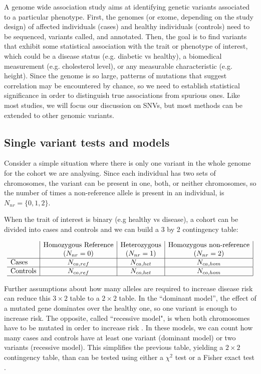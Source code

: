 A genome wide association study aims at identifying genetic variants associated to a particular phenotype. 
First, the genomes (or exome, depending on the study design) of affected individuals (cases) and healthy individuals (controls) need to be sequenced, variants called, and annotated. 
Then, the goal is to find variants that exhibit some statistical association with the trait or phenotype of interest, which could be a disease status (e.g. diabetic vs healthy), a biomedical measurement (e.g. cholesterol level), or any measurable characteristic (e.g. height). 
Since the genome is so large, patterns of mutations that suggest correlation may be encountered by chance, so we need to establish statistical significance in order to distinguish true associations from spurious ones. 
Like most studies, we will focus our discussion on SNVs, but most methods can be extended to other genomic variants.

\subsection{Single variant tests and models \label{sec:single}}

Consider a simple situation where there is only one variant in the whole genome for the cohort we are analysing. 
Since each individual has two sets of chromosomes, the variant can be present in one, both, or neither chromosomes, so the number of times a non-reference allele is present in an individual, is $ N_{nr} = \{0, 1,2\}$.

When the trait of interest is binary (e.g healthy vs disease), a cohort can be divided into cases and controls and we can build a 3 by 2 contingency table:

\[
\begin{array}{l|c|c|c|}
	& \mbox{Homozygous Reference} & \mbox{Heterozygous} & \mbox{Homozygous non-reference}\\
	& (N_{nr} = 0) & (N_{nr} = 1) & (N_{nr} = 2) \\
    \hline 
    \mbox{Cases} & N_{ca,ref} & N_{ca,het} & N_{ca,hom} \\ 
    \hline 
    \mbox{Controls} & N_{co,ref} & N_{co,het} & N_{co,hom} \\
    \hline 
\end{array} 
\]

Further assumptions about how many alleles are required to increase disease risk can reduce this $3 \times 2$ table to a $2 \times 2$ table. 
In the ``dominant model'', the effect of a mutated gene dominates over the healthy one, so one variant is enough to increase risk. 
The opposite, called ``recessive model", is when both chromosomes have to be mutated in order to increase risk \cite{balding2006tutorial, clarke2011basic}. 
In these models, we can count how many cases and controls have at least one variant (dominant model) or two variants (recessive model). 
This simplifies the previous table, yielding a $2 \times 2$ contingency table, than can be tested using either a $\chi^2$ test or a Fisher exact test \cite{balding2006tutorial}.

